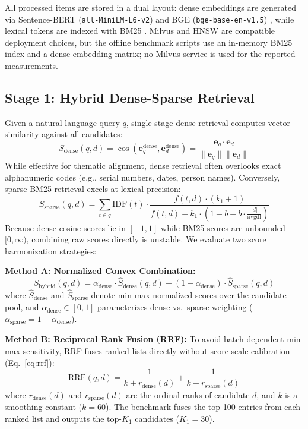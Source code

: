 \documentclass[conference]{IEEEtran}
\begin{document}
All processed items are stored in a dual layout: dense embeddings are generated via Sentence-BERT (\texttt{all-MiniLM-L6-v2}) \cite{reimers2019sbert} and BGE (\texttt{bge-base-en-v1.5}) \cite{xiao2023bge}, while lexical tokens are indexed with BM25 \cite{robertson2009bm25, robertson1995okapi}. Milvus \cite{wang2021milvus} and HNSW \cite{malkov2020hnsw} are compatible deployment choices, but the offline benchmark scripts use an in-memory BM25 index and a dense embedding matrix; no Milvus service is used for the reported measurements.

\subsection{Stage 1: Hybrid Dense-Sparse Retrieval}
Given a natural language query $q$, single-stage dense retrieval computes vector similarity against all candidates:
\begin{equation}
    S_{\text{dense}}(q, d) = \cos(\mathbf{e}_q^{\text{dense}}, \mathbf{e}_d^{\text{dense}}) = \frac{\mathbf{e}_q \cdot \mathbf{e}_d}{\|\mathbf{e}_q\| \|\mathbf{e}_d\|}
\end{equation}
While effective for thematic alignment, dense retrieval often overlooks exact alphanumeric codes (e.g., serial numbers, dates, person names). Conversely, sparse BM25 retrieval excels at lexical precision:
\begin{equation}
    S_{\text{sparse}}(q, d) = \sum_{t \in q} \text{IDF}(t) \cdot \frac{f(t, d) \cdot (k_1 + 1)}{f(t, d) + k_1 \cdot \left(1 - b + b \cdot \frac{|d|}{\text{avgdl}}\right)}
\end{equation}
Because dense cosine scores lie in $[-1, 1]$ while BM25 scores are unbounded $[0, \infty)$, combining raw scores directly is unstable. We evaluate two score harmonization strategies:

\textbf{Method A: Normalized Convex Combination:}
\begin{equation}
    S_{\text{hybrid}}(q, d) = \alpha_{\text{dense}} \cdot \hat{S}_{\text{dense}}(q, d) + (1 - \alpha_{\text{dense}}) \cdot \hat{S}_{\text{sparse}}(q, d)
    \label{eq:hybrid}
\end{equation}
where $\hat{S}_{\text{dense}}$ and $\hat{S}_{\text{sparse}}$ denote min-max normalized scores over the candidate pool, and $\alpha_{\text{dense}} \in [0, 1]$ parameterizes dense vs.\ sparse weighting ($\alpha_{\text{sparse}} = 1 - \alpha_{\text{dense}}$).

\textbf{Method B: Reciprocal Rank Fusion (RRF):}
To avoid batch-dependent min-max sensitivity, RRF \cite{cormack2009rrf} fuses ranked lists directly without score scale calibration (Eq.~\ref{eq:rrf}):
\begin{equation}
    \text{RRF}(q, d) = \frac{1}{k + r_{\text{dense}}(d)} + \frac{1}{k + r_{\text{sparse}}(d)}
    \label{eq:rrf}
\end{equation}
where $r_{\text{dense}}(d)$ and $r_{\text{sparse}}(d)$ are the ordinal ranks of candidate $d$, and $k$ is a smoothing constant ($k = 60$). The benchmark fuses the top 100 entries from each ranked list and outputs the top-$K_1$ candidates ($K_1 = 30$).
\end{document}
